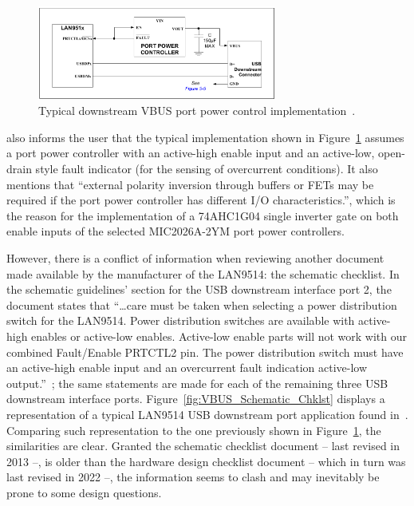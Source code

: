 \begin{figure}[h]
	\centering
	\includegraphics[width=0.7\textwidth]{Chapters/Figures/chapter5/prototype/VBUS_HW_Design_Chklst.pdf}
	\caption{Typical downstream VBUS port power control implementation~\cite{LAN9514_HW_Design_Checklist}.}
	\label{fig:VBUS_HW_Design_Chklst}
\end{figure}%

\cite{LAN9514_HW_Design_Checklist} also informs the user that the typical implementation shown in Figure~\ref{fig:VBUS_HW_Design_Chklst} assumes a port power controller with an active-high enable input and an active-low, open-drain style fault indicator (for the sensing of overcurrent conditions). It also mentions that ``external polarity inversion through buffers or FETs may be required if the port power controller has different I/O characteristics.'', which is the reason for the implementation of a 74AHC1G04 single inverter gate on both enable inputs of the selected MIC2026A-2YM port power controllers.

However, there is a conflict of information when reviewing another document made available by the manufacturer of the LAN9514: the schematic checklist. In the schematic guidelines' section for the USB downstream interface port 2, the document states that ``\dots care must be taken when selecting a power distribution switch for the LAN9514. Power distribution switches are available with active-high enables or active-low enables. Active-low enable parts will not work with our combined Fault/Enable PRTCTL2 pin. The power distribution switch must have an active-high enable input and an overcurrent fault indication active-low output.''~\cite{LAN9514_Schematic_Checklist}; the same statements are made for each of the remaining three USB downstream interface ports. Figure~\ref{fig:VBUS_Schematic_Chklst} displays a representation of a typical LAN9514 USB downstream port application found in~\cite{LAN9514_Schematic_Checklist}. Comparing such representation to the one previously shown in Figure~\ref{fig:VBUS_HW_Design_Chklst}, the similarities are clear. Granted the schematic checklist document -- last revised in 2013 --, is older than the hardware design checklist document -- which in turn was last revised in 2022 --, the information seems to clash and may inevitably be prone to some design questions.

